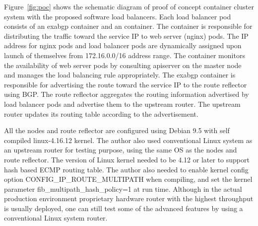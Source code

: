 Figure~\ref{fig:poc} shows the schematic diagram of proof of concept container cluster system with the proposed software load balancers.
%
Each load balancer pod consists of an exabgp \cite{exa-networks_2018} container and an  container.
The  container is responsible for distributing the traffic toward the service IP to web server (nginx) pods.
The IP address for nginx pods and load balancer pods are dynamically assigned upon launch of themselves from 172.16.0.0/16 address range.
The  container monitors the availability of web server pods by consulting apiserver on the master node and manages the load balancing rule appropriately.
The exabgp container is responsible for advertising the route toward the service IP to the route reflector using BGP.
The route reflector aggregates the routing information advertised by load balancer pods and advertise them to the upstream router.
The upstream router updates its routing table according to the advertisement.

All the nodes and route reflector are configured using Debian 9.5 with self compiled linux-4.16.12 kernel.  
The author also used conventional Linux system as an upstream router for testing purpose, using the same OS as the nodes and  route reflector.
The version of Linux kernel needed to be 4.12 or later to support hash based ECMP routing table.
The author also needed to enable kernel config option CONFIG\_IP\_ROUTE\_MULTIPATH \cite{ipsysctl} when compiling, and set the kernel parameter fib\_multipath\_hash\_policy=1 at run time.
Although in the actual production environment\deleted[id=2nd]{,} proprietary hardware router with the highest throughput is usually deployed, one can still test some of the advanced features by using a conventional Linux system  router.

